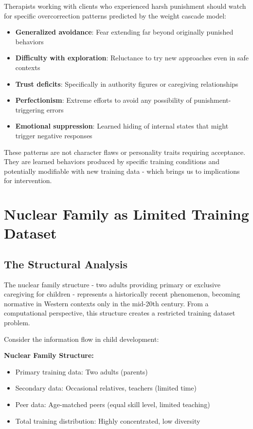 \documentclass{article}
\begin{document}
Therapists working with clients who experienced harsh punishment should watch for specific overcorrection patterns predicted by the weight cascade model:

\begin{itemize}
\item \textbf{Generalized avoidance}: Fear extending far beyond originally punished behaviors
\item \textbf{Difficulty with exploration}: Reluctance to try new approaches even in safe contexts
\item \textbf{Trust deficits}: Specifically in authority figures or caregiving relationships
\item \textbf{Perfectionism}: Extreme efforts to avoid any possibility of punishment-triggering errors
\item \textbf{Emotional suppression}: Learned hiding of internal states that might trigger negative responses
\end{itemize}

These patterns are not character flaws or personality traits requiring acceptance. They are learned behaviors produced by specific training conditions and potentially modifiable with new training data - which brings us to implications for intervention.

\section{Nuclear Family as Limited Training Dataset}

\subsection{The Structural Analysis}

The nuclear family structure - two adults providing primary or exclusive caregiving for children - represents a historically recent phenomenon, becoming normative in Western contexts only in the mid-20th century. From a computational perspective, this structure creates a restricted training dataset problem.

Consider the information flow in child development:

\textbf{Nuclear Family Structure:}
\begin{itemize}
\item Primary training data: Two adults (parents)
\item Secondary data: Occasional relatives, teachers (limited time)
\item Peer data: Age-matched peers (equal skill level, limited teaching)
\item Total training distribution: Highly concentrated, low diversity
\end{itemize}
\end{document}
